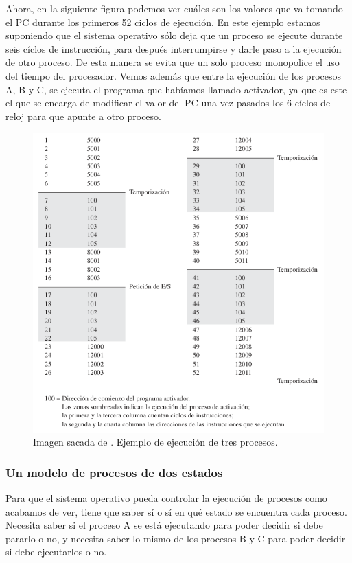 \documentclass[12pt]{article}
\begin{document}
  Ahora, en la siguiente figura podemos ver cuáles son los valores que va tomando el PC durante los primeros 52 ciclos de ejecución. En este ejemplo estamos suponiendo que el sistema operativo sólo deja que un proceso se ejecute durante seis cíclos de instrucción, para después interrumpirse y darle paso a la ejecución de otro proceso. De esta manera se evita que un solo proceso monopolice el uso del tiempo del procesador. Vemos además que entre la ejecución de los procesos A, B y C, se ejecuta el programa que habíamos llamado activador, ya que es este el que se encarga de modificar el valor del PC una vez pasados los 6 cíclos de reloj para que apunte a otro proceso.

  \begin{figure}[H]
    \centering
    \includegraphics[width=\linewidth]{imagenes/ejecucion-de-tres-procesos.png}
    \caption{Imagen sacada de \parencite{sostallings}. Ejemplo de ejecución de tres procesos.}
    \label{fig:ejec-tres-procesos}
  \end{figure}
  
  \subsubsection{Un modelo de procesos de dos estados}
  Para que el sistema operativo pueda controlar la ejecución de procesos como acabamos de ver, tiene que saber sí o sí en qué estado se encuentra cada proceso. Necesita saber si el proceso A se está ejecutando para poder decidir si debe pararlo o no, y necesita saber lo mismo de los procesos B y C para poder decidir si debe ejecutarlos o no.
\end{document}
